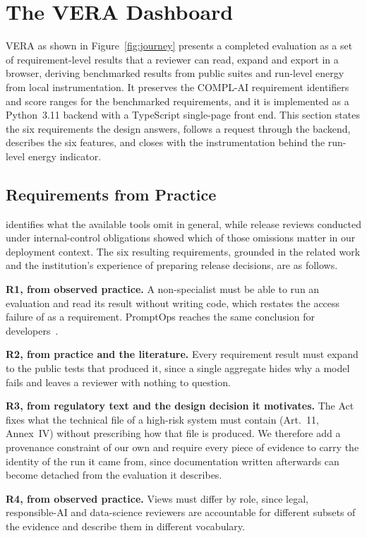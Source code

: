 \documentclass[10pt,conference,a4paper]{IEEEtran}
\begin{document}
\section{The VERA Dashboard}
\label{sec:vera}
VERA as shown in Figure~\ref{fig:journey} presents a completed evaluation as a set of requirement-level results that a reviewer can read, expand and export in a browser, deriving benchmarked results from public suites and run-level energy from local instrumentation.
It preserves the COMPL-AI requirement identifiers and score ranges for the benchmarked requirements, and it is implemented as a Python~3.11 backend with a TypeScript single-page front end.
This section states the six requirements the design answers, follows a request through the backend, describes the six features, and closes with the instrumentation behind the run-level energy indicator.

\subsection{Requirements from Practice}
\label{sec:requirements}
 identifies what the available tools omit in general, while release reviews conducted under internal-control obligations showed which of those omissions matter in our deployment context.
The six resulting requirements, grounded in the related work and the institution's experience of preparing release decisions, are as follows.

\textbf{R1, from observed practice.}
A non-specialist must be able to run an evaluation and read its result without writing code, which restates the access failure of  as a requirement.
PromptOps reaches the same conclusion for developers~\cite{sunetnanta2025promptops}.

\textbf{R2, from practice and the literature.}
Every requirement result must expand to the public tests that produced it, since a single aggregate hides why a model fails and leaves a reviewer with nothing to question.

\textbf{R3, from regulatory text and the design decision it motivates.}
The Act fixes what the technical file of a high-risk system must contain (Art.~11, Annex~IV) without prescribing how that file is produced.
We therefore add a provenance constraint of our own and require every piece of evidence to carry the identity of the run it came from, since documentation written afterwards can become detached from the evaluation it describes.

\textbf{R4, from observed practice.}
Views must differ by role, since legal, responsible-AI and data-science reviewers are accountable for different subsets of the evidence and describe them in different vocabulary.
\end{document}
